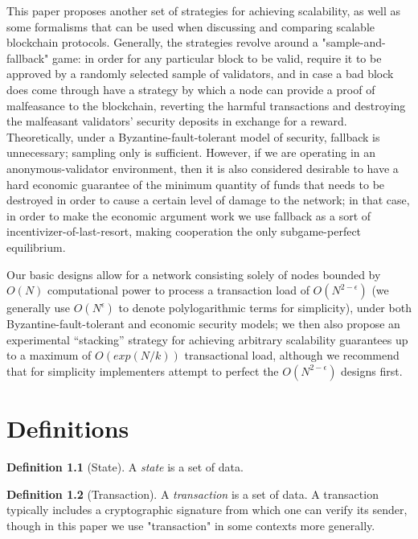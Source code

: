 \documentclass[11pt,a4paper]{report}
\theoremstyle{plain}
\theoremstyle{definition}
\newtheorem{defn}{Definition}[chapter]
\theoremstyle{remark}
\begin{document}
This paper proposes another set of strategies for achieving scalability, as well as some formalisms that can be used when discussing and comparing scalable blockchain protocols. Generally, the strategies revolve around a "sample-and-fallback" game: in order for any particular block to be valid, require it to be approved by a randomly selected sample of validators, and in case a bad block does come through have a strategy by which a node can provide a proof of malfeasance to the blockchain, reverting the harmful transactions and destroying the malfeasant validators' security deposits in exchange for a reward. Theoretically, under a Byzantine-fault-tolerant model of security, fallback is unnecessary; sampling only is sufficient. However, if we are operating in an anonymous-validator environment, then it is also considered desirable to have a hard economic guarantee of the minimum quantity of funds that needs to be destroyed in order to cause a certain level of damage to the network; in that case, in order to make the economic argument work we use fallback as a sort of incentivizer-of-last-resort, making cooperation the only subgame-perfect equilibrium.

Our basic designs allow for a network consisting solely of nodes bounded by $O(N)$ computational power to process a transaction load of $O(N^{2-\epsilon})$ (we generally use $O(N^\epsilon)$ to denote polylogarithmic terms for simplicity), under both Byzantine-fault-tolerant and economic security models; we then also propose an experimental ``stacking'' strategy for achieving arbitrary scalability guarantees up to a maximum of $O(exp(N/k))$ transactional load, although we recommend that for simplicity implementers attempt to perfect the $O(N^{2-\epsilon})$ designs first.

\chapter{Definitions}

\begin{defn}[State]
A \emph{state} is a set of data.
\end{defn}

\begin{defn}[Transaction]
A \emph{transaction} is a set of data. A transaction typically includes a cryptographic signature from which one can verify its sender, though in this paper we use "transaction" in some contexts more generally.
\end{defn}
\end{document}
